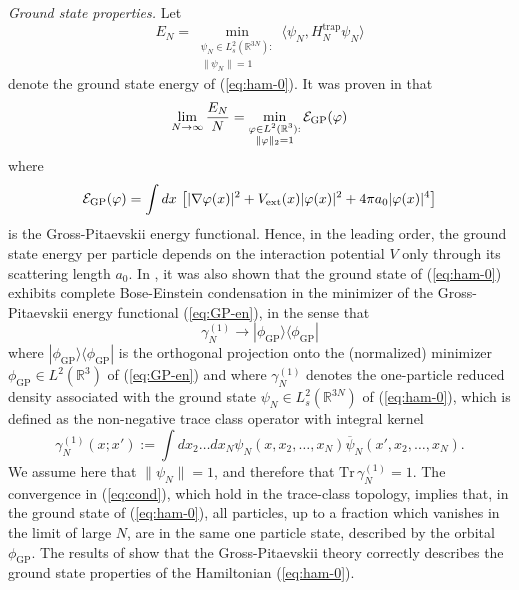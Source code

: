 \documentclass[11pt,a4paper]{article}
\newcommand{\bR}{{\mathbb R}}
\newcommand{\tr}{\mbox{Tr}}
\newcommand{\cE}{{\cal E}}
\begin{document}
{\it Ground state properties.} Let \[ E_N = \min_{\substack{\psi_N \in L^2_s (\bR^{3N}): \\ \| \psi_N \| = 1}} \langle \psi_N , H^{\text{trap}}_N \psi_N \rangle \]
denote the ground state energy of (\ref{eq:ham-0}). It was proven in \cite{LSY} that
\[ \lim_{N \to \infty} \frac{E_N}{N} = \min_{\substack{\varphi \in L^2 (\bR^3): \\ \| \varphi \|_2 = 1}} \cE_{\text{GP}} (\varphi) \]
where 
\begin{equation}\label{eq:GP-en} \cE_{\text{GP}} (\varphi) = \int dx \, \left[ |\nabla \varphi (x)|^2 + V_{\text{ext}} (x) |\varphi (x)|^2 + 4 \pi a_0 |\varphi (x)|^4 \right] \end{equation}
is the Gross-Pitaevskii energy functional. Hence, in the leading order, the ground state energy per particle depends on the interaction potential $V$ only through its scattering length $a_0$. In \cite{LS}, it was also shown that the ground state of (\ref{eq:ham-0}) exhibits complete Bose-Einstein condensation in the minimizer of the Gross-Pitaevskii energy functional (\ref{eq:GP-en}),
in the sense that 
\begin{equation}\label{eq:cond} \gamma_N^{(1)} \to | \phi_{\text{GP}} \rangle \langle \phi_{\text{GP}}| \end{equation}
where $|\phi_{\text{GP}} \rangle \langle \phi_{\text{GP}} |$ is the orthogonal projection onto the (normalized) 
minimizer $\phi_{\text{GP}} \in L^2 (\bR^3)$ of (\ref{eq:GP-en}) and where $\gamma^{(1)}_N$ denotes the one-particle reduced density associated with the ground state $\psi_N \in L^2_s (\bR^{3N})$ of (\ref{eq:ham-0}), which is defined as the non-negative trace class operator with integral kernel
\begin{equation}\label{eq:one-red} \gamma^{(1)}_N (x;x') := \int dx_2 \dots dx_N \psi_N (x , x_2, \dots  ,x_N) \overline{\psi}_N (x' , x_2 , \dots , x_N). \end{equation}
We assume here that $\| \psi_N \|  =1$, and therefore that $\tr \, \gamma^{(1)}_N = 1$. The convergence in (\ref{eq:cond}), which hold in the trace-class topology, implies that, in the ground state of (\ref{eq:ham-0}), all particles, up to a fraction which vanishes in the limit of large $N$, are in the same one particle state, described by the orbital $\phi_{\text{GP}}$. The results of \cite{LSY,LS} show that the Gross-Pitaevskii theory correctly describes the ground state properties of the Hamiltonian (\ref{eq:ham-0}). 

\bigskip
\end{document}
